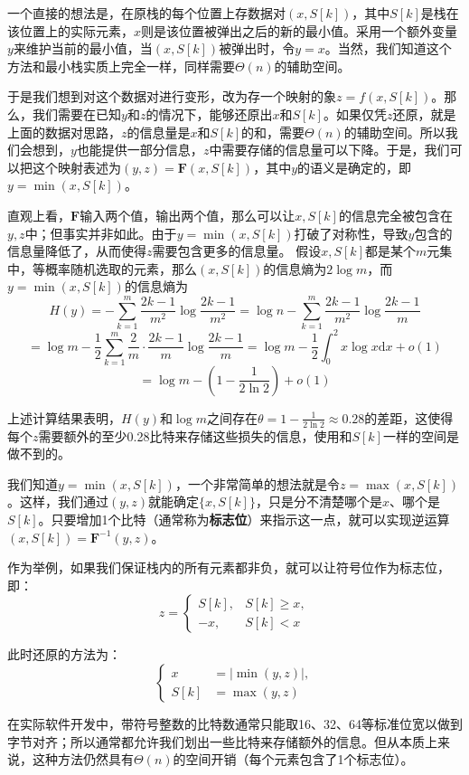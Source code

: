 一个直接的想法是，在原栈的每个位置上存数据对$(x,S[k])$，其中$S[k]$是栈在该位置上的实际元素，$x$则是该位置被弹出之后的新的最小值。采用一个额外变量$y$来维护当前的最小值，当$(x,S[k])$被弹出时，令$y=x$。当然，我们知道这个方法和最小栈实质上完全一样，同样需要$\Theta(n)$的辅助空间。

于是我们想到对这个数据对进行变形，改为存一个映射的象$z=f(x,S[k])$。那么，我们需要在已知$y$和$z$的情况下，能够还原出$x$和$S[k]$。如果仅凭$z$还原，就是上面的数据对思路，$z$的信息量是$x$和$S[k]$的和，需要$\Theta(n)$的辅助空间。所以我们会想到，$y$也能提供一部分信息，$z$中需要存储的信息量可以下降。于是，我们可以把这个映射表述为$(y,z) = \mathbf{F}(x, S[k])$，其中$y$的语义是确定的，即$y = \min (x,S[k])$。

直观上看，$\mathbf{F}$输入两个值，输出两个值，那么可以让$x,S[k]$的信息完全被包含在$y,z$中；但事实并非如此。由于$y = \min(x, S[k])$打破了对称性，导致$y$包含的信息量降低了，从而使得$z$需要包含更多的信息量。
假设$x,S[k]$都是某个$m$元集中，等概率随机选取的元素，那么$(x,S[k])$的信息熵为$2\log m$，而$y=\min (x, S[k])$的信息熵为
$$
H(y) = -\sum_{k=1}^{m} \frac{2k-1}{m^2} \log  \frac{2k-1}{m^2} = \log n -\sum _{k=1}^m \frac{2k-1}{m^2}\log \frac{2k-1}{m}
$$
$$
= \log m - \frac{1}{2}\sum _{k=1}^m \frac{2}{m}\cdot \frac{2k-1}{m}\log \frac{2k-1}{m} 
= \log m - \frac{1}{2} \int_0^{2} x\log x \mathrm{d}x + o(1)
$$
$$
= \log m - \left(1 - \frac{1}{2\ln 2}\right) + o(1)
$$

上述计算结果表明，$H(y)$和$\log m$之间存在$\theta = 1 - \frac{1}{2\ln 2}\approx 0.28$的差距，这使得每个$z$需要额外的至少0.28比特来存储这些损失的信息，使用和$S[k]$一样的空间是做不到的。

我们知道$y = \min(x, S[k])$，一个非常简单的想法就是令$z = \max(x, S[k])$。这样，我们通过$(y,z)$就能确定$\{x,S[k]\}$，只是分不清楚哪个是$x$、哪个是$S[k]$。只要增加1个比特（通常称为\textbf{标志位}）来指示这一点，就可以实现逆运算$(x,S[k]) = \mathbf{F}^{-1}(y,z)$。

作为举例，如果我们保证栈内的所有元素都非负，就可以让符号位作为标志位，即：
$$
z = \begin{cases}
    S[k],&S[k]\ge x,\\
    -x,&S[k]<x
\end{cases}
$$

此时还原的方法为：
$$
\begin{cases}
    x &= |\min(y,z)|,\\
    S[k] &= \max(y,z)
\end{cases}
$$

在实际软件开发中，带符号整数的比特数通常只能取16、32、64等标准位宽以做到字节对齐；所以通常都允许我们划出一些比特来存储额外的信息。但从本质上来说，这种方法仍然具有$\Theta(n)$的空间开销（每个元素包含了1个标志位）。

